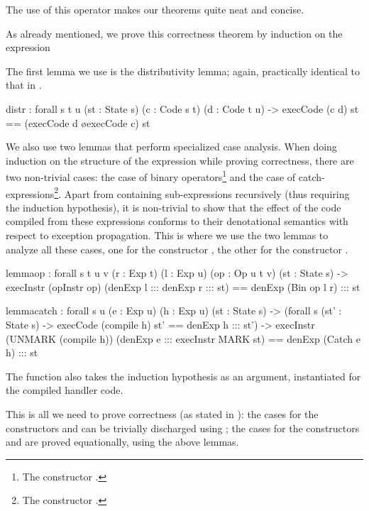 \noindent The use of this operator makes our theorems quite neat and concise.

As already mentioned, we prove this correctness theorem by induction on the
expression 

The first lemma we use is the distributivity lemma; again, practically
identical to that in .
\begin{code}
  distr : forall {s t u} (st : State s) (c : Code s t) (d : Code t u)
    -> execCode (c \app d) st == (execCode d \o execCode c) st
\end{code}

We also use two lemmas that perform specialized case analysis. When doing
induction on the structure of the expression while proving correctness, there
are two non-trivial cases: the case of binary operators\footnote{The
constructor .} and the case of catch-expressions\footnote{The
constructor .}. Apart from containing sub-expressions recursively
(thus requiring the induction hypothesis), it is non-trivial to show that the
effect of the code compiled from these expressions conforms to their
denotational semantics with respect to exception propagation.  This is where we
use the two lemmas to analyze all these cases, one for the constructor
, the other for the constructor .

\begin{code}
  lemma\-op : forall {s t u v} (r : Exp t) (l : Exp u) (op : Op u t v) (st : State s)
    -> execInstr (opInstr op) (denExp l ::: denExp r ::: st)
      == denExp (Bin op l r) ::: st
\end{code}

\begin{code}
  lemma\-catch : forall {s u} (e : Exp u) (h : Exp u) (st : State s)
    -> (forall {s} (st' : State s) -> execCode (compile h) st' == denExp h ::: st')
    -> execInstr (UNMARK (compile h)) (denExp e ::: execInstr MARK st)
      == denExp (Catch e h) ::: st
\end{code}

The function  also takes the induction hypothesis as an
argument, instantiated for the compiled handler code.

This is all we need to prove correctness (as stated in
): the cases for the constructors  and
 can be trivially discharged using ; the cases for the
constructors  and  are proved equationally, using the
above lemmas.

